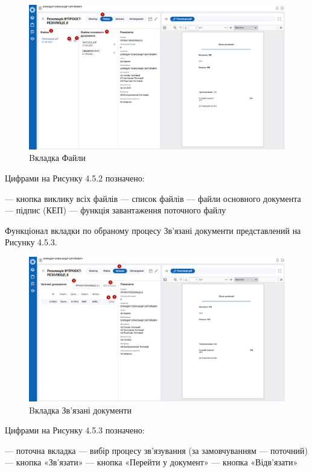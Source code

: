 \begin{figure}[!htbp]
\centerline{\includegraphics[width=\textwidth]{img/4.5.2.png}}
\caption{Bкладка Файли}
\end{figure}

Цифрами на Рисунку 4.5.2 позначено:

 --- кнопка виклику всіх файлів
 --- список файлів
 --- файли основного документа
 --- підпис (КЕП)
 --- функція завантаження поточного файлу

Функціонал вкладки по обраному процесу Зв’язані документи представлений на
Рисунку 4.5.3.

\begin{figure}[!htbp]
\centerline{\includegraphics[width=\textwidth]{img/4.5.3.png}}
\caption{Bкладка Зв’язані документи}
\end{figure}

Цифрами на Рисунку 4.5.3 позначено:

 --- поточна вкладка
 --- вибір процесу зв’язування (за замовчуванням --- поточний)
 --- кнопка «Зв’язати»
 --- кнопка «Перейти у документ»
 --- кнопка «Відв’язати»

